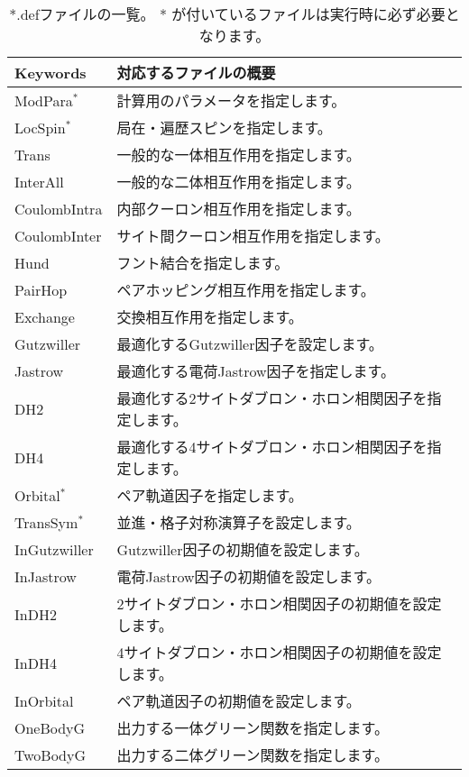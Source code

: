  \begin{table*}[h!]
\begin{center}
  \begin{tabular}{|ll|} \hline
           Keywords     & 対応するファイルの概要       \\   \hline\hline
           ModPara$^*$       &  計算用のパラメータを指定します。       \\ \hline 
           LocSpin$^*$         &  局在・遍歴スピンを指定します。\\ 
           Trans       &   一般的な一体相互作用を指定します。\\
           InterAll  &   一般的な二体相互作用を指定します。\\  
           CoulombIntra  &   内部クーロン相互作用を指定します。\\  
           CoulombInter  &   サイト間クーロン相互作用を指定します。\\  
           Hund  &   フント結合を指定します。\\  
           PairHop  &  ペアホッピング相互作用を指定します。 \\  
           Exchange  &  交換相互作用を指定します。\\  \hline
           Gutzwiller & 最適化するGutzwiller因子を設定します。\\
           Jastrow & 最適化する電荷Jastrow因子を指定します。\\
           DH2 & 最適化する2サイトダブロン・ホロン相関因子を指定します。\\
           DH4 & 最適化する4サイトダブロン・ホロン相関因子を指定します。\\
           Orbital$^*$  & ペア軌道因子を指定します。\\
           TransSym$^*$  & 並進・格子対称演算子を設定します。\\ \hline
           InGutzwiller & Gutzwiller因子の初期値を設定します。\\
           InJastrow & 電荷Jastrow因子の初期値を設定します。\\
           InDH2 & 2サイトダブロン・ホロン相関因子の初期値を設定します。\\
           InDH4 & 4サイトダブロン・ホロン相関因子の初期値を設定します。\\
           InOrbital & ペア軌道因子の初期値を設定します。\\ \hline
           OneBodyG         &   出力する一体グリーン関数を指定します。\\   
           TwoBodyG &   出力する二体グリーン関数を指定します。\\   \hline
  \end{tabular}
\end{center}
\caption{*.defファイルの一覧。 * が付いているファイルは実行時に必ず必要となります。}
\label{Table:Defs}
\end{table*}%

